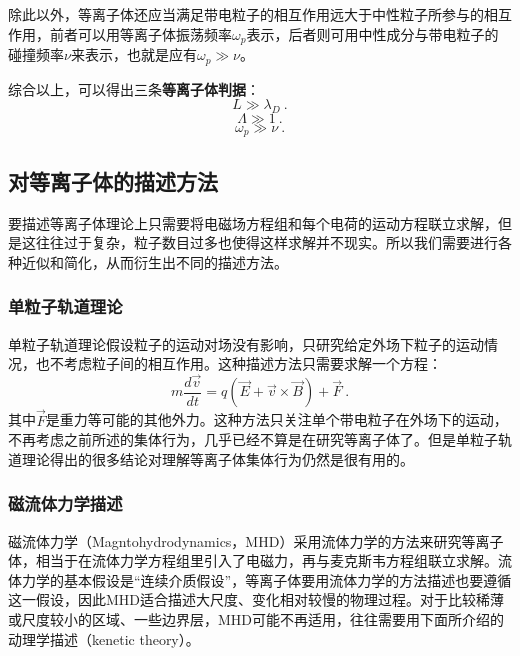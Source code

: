 		除此以外，等离子体还应当满足带电粒子的相互作用远大于中性粒子所参与的相互作用，前者可以用等离子体振荡频率$\omega_p$表示，后者则可用中性成分与带电粒子的碰撞频率$\nu$来表示，也就是应有$\omega_p\gg\nu$。
		
		综合以上，可以得出三条\textbf{等离子体判据}：
		\begin{equation} 
		L\gg \lambda_D~.
		\end{equation}
		\begin{equation} 
		\varLambda\gg1~.
		\end{equation}
		\begin{equation} 
		\omega_p\gg\nu~.
		\end{equation}
		
		\subsection{对等离子体的描述方法}
		
    要描述等离子体理论上只需要将电磁场方程组和每个电荷的运动方程联立求解，但是这往往过于复杂，粒子数目过多也使得这样求解并不现实。所以我们需要进行各种近似和简化，从而衍生出不同的描述方法。
			\subsubsection{单粒子轨道理论}
			
      单粒子轨道理论假设粒子的运动对场没有影响，只研究给定外场下粒子的运动情况，也不考虑粒子间的相互作用。这种描述方法只需要求解一个方程：
			\begin{equation} 
			m\frac{d\vec{v}}{dt}=q(\vec{E}+\vec{v}\times\vec{B})+\vec{F}~.
			\end{equation}
			其中$\vec{F}$是重力等可能的其他外力。这种方法只关注单个带电粒子在外场下的运动，不再考虑之前所述的集体行为，几乎已经不算是在研究等离子体了。但是单粒子轨道理论得出的很多结论对理解等离子体集体行为仍然是很有用的。
			
			\subsubsection{磁流体力学描述}
			磁流体力学（Magntohydrodynamics，MHD）采用流体力学的方法来研究等离子体，相当于在流体力学方程组里引入了电磁力，再与麦克斯韦方程组联立求解。流体力学的基本假设是“连续介质假设”，等离子体要用流体力学的方法描述也要遵循这一假设，因此MHD适合描述大尺度、变化相对较慢的物理过程。对于比较稀薄或尺度较小的区域、一些边界层，MHD可能不再适用，往往需要用下面所介绍的动理学描述（kenetic theory）。
			
